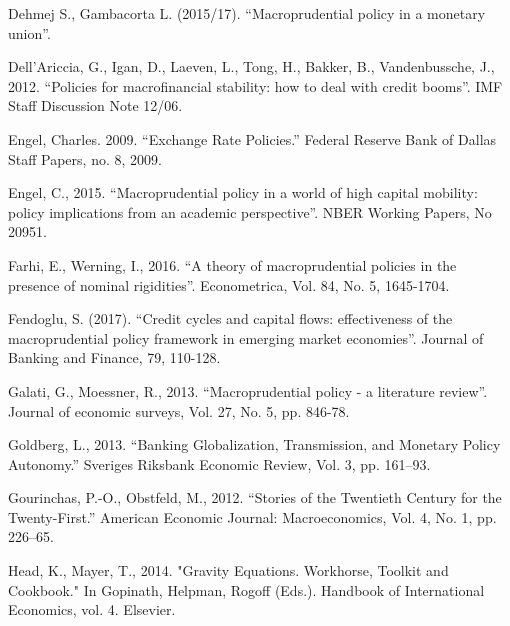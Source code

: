 \documentclass[12pt,a4paper]{article}
\begin{document}


Dehmej S., Gambacorta L. (2015/17). “Macroprudential policy in a monetary union”.

Dell’Ariccia, G., Igan, D., Laeven, L., Tong, H., Bakker, B., Vandenbussche, J., 2012.
“Policies for macrofinancial stability: how to deal with credit booms”. IMF Staff
Discussion Note 12/06.


Engel, Charles. 2009. “Exchange Rate Policies.” Federal Reserve Bank of Dallas Staff Papers, no. 8, 2009.

Engel, C., 2015. “Macroprudential policy in a world of high capital mobility: policy implications from an academic perspective”. NBER Working Papers, No 20951.

Farhi, E., Werning, I., 2016. “A theory of macroprudential policies in the presence of nominal rigidities”. Econometrica, Vol. 84, No. 5, 1645-1704.

Fendoglu, S. (2017). “Credit cycles and capital flows: effectiveness of the macroprudential policy framework in emerging market economies”. Journal of Banking and Finance, 79, 110-128.



Galati, G., Moessner, R., 2013. “Macroprudential policy - a literature review”. Journal of economic surveys, Vol. 27, No. 5, pp. 846-78.

Goldberg, L., 2013. “Banking Globalization, Transmission, and Monetary Policy Autonomy.” Sveriges Riksbank Economic Review, Vol. 3, pp. 161–93.

Gourinchas, P.-O., Obstfeld, M., 2012. “Stories of the Twentieth Century for the Twenty-First.” American Economic Journal: Macroeconomics, Vol. 4, No. 1, pp. 226–65.

Head, K., Mayer, T., 2014. "Gravity Equations. Workhorse, Toolkit and Cookbook." In Gopinath, Helpman, Rogoff (Eds.). Handbook of International Economics, vol. 4. Elsevier.
\end{document}
